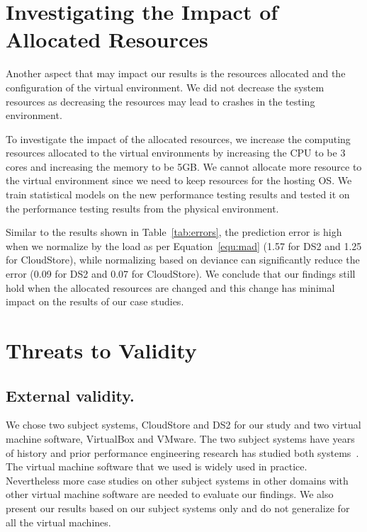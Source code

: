 	
\section{Investigating the Impact of Allocated Resources}

Another aspect that may impact our results is the resources allocated and the configuration of the virtual environment. We did not decrease the system resources as decreasing the resources may lead to crashes in the testing environment.

To investigate the impact of the allocated resources, we increase the computing resources allocated to the virtual environments by increasing the CPU to be 3 cores and increasing the memory to be 5GB. We cannot allocate more resource to the virtual environment since we need to keep resources for the hosting OS. We train statistical models on the new performance testing results and tested it on the performance testing results from the physical environment. 

Similar to the results shown in Table~\ref{tab:errors}, the prediction error is high when we normalize by the load as per Equation~\ref{equ:mad} (1.57 for DS2 and 1.25 for CloudStore), while normalizing based on deviance can significantly reduce the error (0.09 for DS2 and 0.07 for CloudStore). We conclude that our findings still hold when the allocated resources are changed and this change has minimal impact on the results of our case studies.

	
	\section{Threats to Validity}
	\label{sec:threats}
	
	
	\subsection{External validity.}
	We chose two subject systems, CloudStore and DS2 for our study and two virtual machine software, VirtualBox and VMware. The two subject systems have years of history and prior performance engineering research has studied both systems~\cite{jackicsm2009,Nguyen:2012:ADP:2188286.2188344,tarekmsr16}. The virtual machine software that we used is widely used in practice. Nevertheless more case studies on other subject systems in other domains with other virtual machine software are needed to evaluate our findings. We also present our results based on our subject systems only and do not generalize for all the virtual machines.
	
